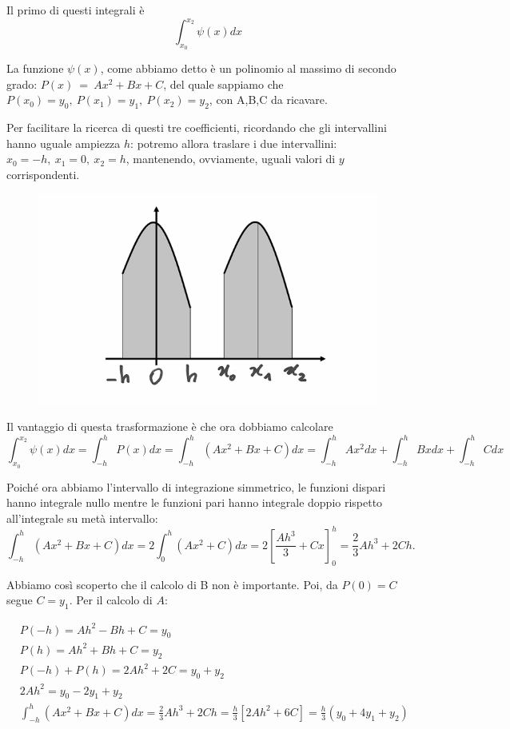 \documentclass{article}
\begin{document}
Il primo di questi integrali è
\[
\int_{x_0}^{x_2}\psi(x)dx\]

La funzione $\psi(x)$, come abbiamo detto è un polinomio al massimo di secondo grado: $P(x)~=~Ax^2+Bx+C$, del quale sappiamo che $P(x_0)=y_0,\ P(x_1)=y_1,\ P(x_2)=y_2$, con A,B,C da ricavare.

Per facilitare la ricerca di questi tre coefficienti, ricordando che gli intervallini hanno uguale ampiezza $h$: potremo allora traslare i due intervallini: $x_0=-h,\ x_1=0,\ x_2=h$, mantenendo, ovviamente, uguali valori di $y$ corrispondenti.

\begin{figure}[ht]
\centering
\includegraphics[scale=0.25]{img/09_04_simmetria.png} 
\label{fig:trasl}
\end{figure}

Il vantaggio di questa trasformazione è che ora dobbiamo calcolare
\[
\int_{x_0}^{x_2}\psi(x)dx=\int_{-h}^{h}P(x)dx=\int_{-h}^{h}(Ax^2+Bx+C)dx=
\int_{-h}^{h}Ax^2dx+\int_{-h}^{h}Bxdx+\int_{-h}^{h}Cdx\]

Poiché ora abbiamo l’intervallo di integrazione simmetrico, le funzioni dispari hanno integrale nullo mentre le funzioni pari hanno integrale doppio rispetto all’integrale su metà intervallo:
\[
\int_{-h}^{h}(Ax^2+Bx+C)dx= 2 \int_0^{h}(Ax^2+C)dx
=2\left[\frac{Ah^3}{3}+Cx\right]_0^h=\frac{2}{3}Ah^3+2Ch.\]

Abbiamo così scoperto che il calcolo di B non è importante. Poi, da $P(0)=C$ segue $C=y_1$. Per il calcolo di $A$:

\begin{align*}
&P(-h)=Ah^2-Bh+C=y_0\\
&P(h)=Ah^2+Bh+C=y_2\\
&P(-h)+P(h)=2Ah^2+2C=y_0+y_2\\
&2Ah^2=y_0-2y_1+y_2\\
&\int_{-h}^{h}(Ax^2+Bx+C)dx=\frac{2}{3}Ah^3+2Ch=\frac{h}{3}\left[2Ah^2+6C \right]=
\frac{h}{3}(y_0+4y_1+y_2)
\end{align*}
\end{document}
